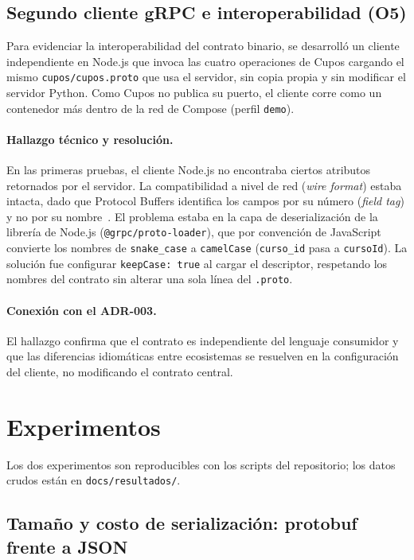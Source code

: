 \documentclass[11pt,spanish]{article}
\begin{document}
\subsection{Segundo cliente gRPC e interoperabilidad (O5)}\label{sec:o5}

Para evidenciar la interoperabilidad del contrato binario, se desarrolló un cliente independiente en Node.js que invoca las cuatro operaciones de Cupos cargando el mismo \texttt{cupos/cupos.proto} que usa el servidor, sin copia propia y sin modificar el servidor Python. Como Cupos no publica su puerto, el cliente corre como un contenedor más dentro de la red de Compose (perfil \texttt{demo}).

\paragraph{Hallazgo técnico y resolución.} En las primeras pruebas, el cliente Node.js no encontraba ciertos atributos retornados por el servidor. La compatibilidad a nivel de red (\textit{wire format}) estaba intacta, dado que Protocol Buffers identifica los campos por su número (\textit{field tag}) y no por su nombre~\cite{protobuf}. El problema estaba en la capa de deserialización de la librería de Node.js (\texttt{@grpc/proto-loader}), que por convención de JavaScript convierte los nombres de \texttt{snake\_case} a \texttt{camelCase} (\texttt{curso\_id} pasa a \texttt{cursoId}). La solución fue configurar \texttt{keepCase: true} al cargar el descriptor, respetando los nombres del contrato sin alterar una sola línea del \texttt{.proto}.

\paragraph{Conexión con el ADR-003.} El hallazgo confirma que el contrato es independiente del lenguaje consumidor y que las diferencias idiomáticas entre ecosistemas se resuelven en la configuración del cliente, no modificando el contrato central.

\section{Experimentos}

Los dos experimentos son reproducibles con los scripts del repositorio; los datos crudos están en \texttt{docs/resultados/}.

\subsection{Tamaño y costo de serialización: protobuf frente a JSON}\label{sec:exp-serializacion}
\end{document}
